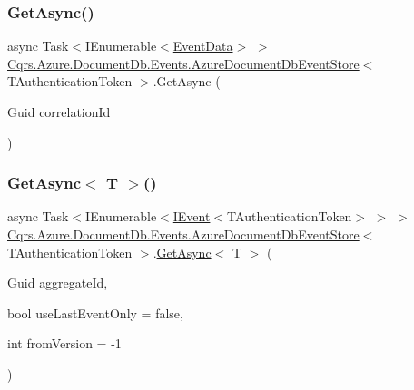 \subsubsection{\texorpdfstring{Get\+Async()}{GetAsync()}\hspace{0.1cm}{\footnotesize\ttfamily [2/2]}}
{\footnotesize\ttfamily async Task$<$I\+Enumerable$<$\hyperlink{classCqrs_1_1Events_1_1EventData}{Event\+Data}$>$ $>$ \hyperlink{classCqrs_1_1Azure_1_1DocumentDb_1_1Events_1_1AzureDocumentDbEventStore}{Cqrs.\+Azure.\+Document\+Db.\+Events.\+Azure\+Document\+Db\+Event\+Store}$<$ T\+Authentication\+Token $>$.Get\+Async (\begin{DoxyParamCaption}\item[{Guid}]{correlation\+Id }\end{DoxyParamCaption})\hspace{0.3cm}{\ttfamily [protected]}}

\mbox{\label{classCqrs_1_1Azure_1_1DocumentDb_1_1Events_1_1AzureDocumentDbEventStore_a2845015d6fda0d9e79b77b82d9452a4d_a2845015d6fda0d9e79b77b82d9452a4d}} 
\subsubsection{\texorpdfstring{Get\+Async$<$ T $>$()}{GetAsync< T >()}}
{\footnotesize\ttfamily async Task$<$I\+Enumerable$<$\hyperlink{interfaceCqrs_1_1Events_1_1IEvent}{I\+Event}$<$T\+Authentication\+Token$>$ $>$ $>$ \hyperlink{classCqrs_1_1Azure_1_1DocumentDb_1_1Events_1_1AzureDocumentDbEventStore}{Cqrs.\+Azure.\+Document\+Db.\+Events.\+Azure\+Document\+Db\+Event\+Store}$<$ T\+Authentication\+Token $>$.\hyperlink{classCqrs_1_1Azure_1_1DocumentDb_1_1Events_1_1AzureDocumentDbEventStore_a8b481bf0b0f6b50184441965630f5443_a8b481bf0b0f6b50184441965630f5443}{Get\+Async}$<$ T $>$ (\begin{DoxyParamCaption}\item[{Guid}]{aggregate\+Id,  }\item[{bool}]{use\+Last\+Event\+Only = {\ttfamily false},  }\item[{int}]{from\+Version = {\ttfamily -\/1} }\end{DoxyParamCaption})\hspace{0.3cm}{\ttfamily [protected]}}

